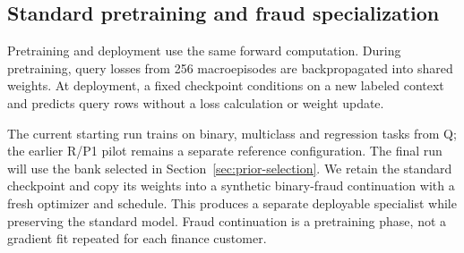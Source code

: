 \documentclass[11pt]{article}
\begin{document}
\subsection{Standard pretraining and fraud specialization}
\label{sec:training-overview}

Pretraining and deployment use the same forward computation. During pretraining, query losses from 256 macroepisodes are backpropagated into shared weights. At deployment, a fixed checkpoint conditions on a new labeled context and predicts query rows without a loss calculation or weight update.

The current starting run trains on binary, multiclass and regression tasks from Q; the earlier R/P1 pilot remains a separate reference configuration. The final run will use the bank selected in Section~\ref{sec:prior-selection}. We retain the standard checkpoint and copy its weights into a synthetic binary-fraud continuation with a fresh optimizer and schedule. This produces a separate deployable specialist while preserving the standard model. Fraud continuation is a pretraining phase, not a gradient fit repeated for each finance customer.
\end{document}
